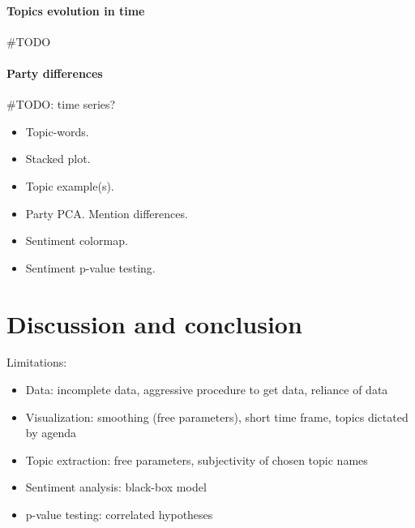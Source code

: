 \documentclass{article}
\begin{document}
\paragraph{Topics evolution in time}
\#TODO

\paragraph{Party differences}
\#TODO: time series?



\begin{itemize}
  \item Topic-words.
  \item Stacked plot.
  \item Topic example(s).
  \item Party PCA. Mention differences.
  \item Sentiment colormap.
  \item Sentiment p-value testing.
\end{itemize}

\section{Discussion and conclusion}
Limitations:
\begin{itemize}
  \item Data: incomplete data, aggressive procedure to get data, reliance of data
  \item Visualization: smoothing (free parameters), short time frame, topics dictated by agenda
  \item Topic extraction: free parameters, subjectivity of chosen topic names
  \item Sentiment analysis: black-box model
  \item p-value testing: correlated hypotheses
\end{itemize}



\end{document}
